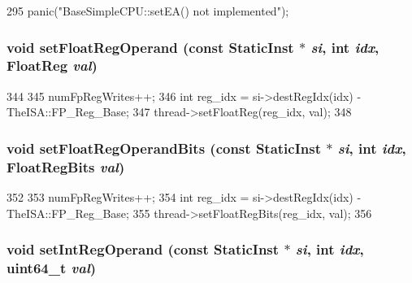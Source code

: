 \begin{DoxyCode}
295 { panic("BaseSimpleCPU::setEA() not implemented\n"); }
\end{DoxyCode}
\hypertarget{classBaseSimpleCPU_addc8b4b6511725bf8ff48bd09ef22892}{
\subsubsection[{setFloatRegOperand}]{\setlength{\rightskip}{0pt plus 5cm}void setFloatRegOperand (const {\bf StaticInst} $\ast$ {\em si}, \/  int {\em idx}, \/  {\bf FloatReg} {\em val})}}
\label{classBaseSimpleCPU_addc8b4b6511725bf8ff48bd09ef22892}



\begin{DoxyCode}
344     {
345         numFpRegWrites++;
346         int reg_idx = si->destRegIdx(idx) - TheISA::FP_Reg_Base;
347         thread->setFloatReg(reg_idx, val);
348     }
\end{DoxyCode}
\hypertarget{classBaseSimpleCPU_a80a516966713c873cf964af7538dbd37}{
\subsubsection[{setFloatRegOperandBits}]{\setlength{\rightskip}{0pt plus 5cm}void setFloatRegOperandBits (const {\bf StaticInst} $\ast$ {\em si}, \/  int {\em idx}, \/  {\bf FloatRegBits} {\em val})}}
\label{classBaseSimpleCPU_a80a516966713c873cf964af7538dbd37}



\begin{DoxyCode}
352     {
353         numFpRegWrites++;
354         int reg_idx = si->destRegIdx(idx) - TheISA::FP_Reg_Base;
355         thread->setFloatRegBits(reg_idx, val);
356     }
\end{DoxyCode}
\hypertarget{classBaseSimpleCPU_a654e99f2be7cd298378462ce9651bb44}{
\subsubsection[{setIntRegOperand}]{\setlength{\rightskip}{0pt plus 5cm}void setIntRegOperand (const {\bf StaticInst} $\ast$ {\em si}, \/  int {\em idx}, \/  uint64\_\-t {\em val})}}
\label{classBaseSimpleCPU_a654e99f2be7cd298378462ce9651bb44}



